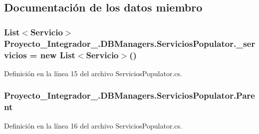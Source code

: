 \subsection{Documentación de los datos miembro}
\hypertarget{class_proyecto___integrador__3_1_1_d_b_managers_1_1_servicios_populator_af7501f1e6be90cfec6b9b974b6d8b911}{
\subsubsection[{\-\_\-servicios}]{\setlength{\rightskip}{0pt plus 5cm}List$<${\bf Servicio}$>$ Proyecto\-\_\-\-Integrador\-\_.\-D\-B\-Managers.\-Servicios\-Populator.\-\_\-servicios = new List$<${\bf Servicio}$>$()\hspace{0.3cm}{\ttfamily [private]}}}\label{class_proyecto___integrador__3_1_1_d_b_managers_1_1_servicios_populator_af7501f1e6be90cfec6b9b974b6d8b911}


Definición en la línea 15 del archivo Servicios\-Populator.\-cs.

\hypertarget{class_proyecto___integrador__3_1_1_d_b_managers_1_1_servicios_populator_a56aa6fea49cfd991726dc8c67e4e1742}{
\subsubsection[{Parent}]{ Proyecto\-\_\-\-Integrador\-\_.\-D\-B\-Managers.\-Servicios\-Populator.\-Parent\hspace{0.3cm}{\ttfamily [private]}}}\label{class_proyecto___integrador__3_1_1_d_b_managers_1_1_servicios_populator_a56aa6fea49cfd991726dc8c67e4e1742}


Definición en la línea 16 del archivo Servicios\-Populator.\-cs.



